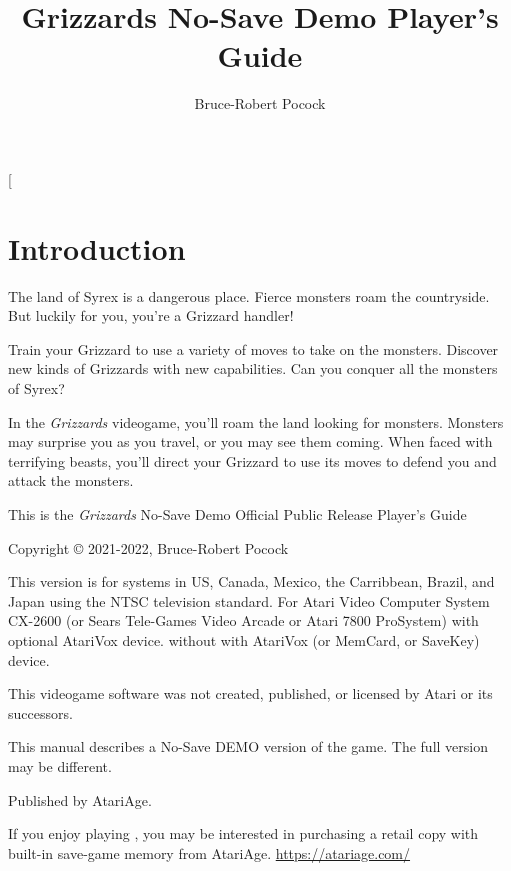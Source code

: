 \documentclass[10pt,twocolumn,openany,article]{memoir}
\title{Grizzards \ifdefined\NOSAVE No-Save \fi\ifdefined\DEMO Demo \fi Player's Guide}
\author{Bruce-Robert Pocock}
\newcommand\TV{NTSC}
\newcommand\REGION{US, Canada, Mexico, the Carribbean, Brazil, and Japan}
\newcommand\TV{PAL}
\newcommand\REGION{UK and Europe (except France)}
\newcommand\TV{SECAM}
\newcommand\REGION{France, Russia, and Africa}
\begin{document}
\frontmatter


\thispagestyle{empty}


\twocolumn[

\chapter*{Introduction}\label{Introduction}

The  land of  Syrex  is  a dangerous  place.  Fierce  monsters roam  the
countryside. But luckily for you, you're a Grizzard handler!

Train your Grizzard to  use a variety of moves to  take on the monsters.
Discover new kinds  of Grizzards with new capabilities.  Can you conquer
all the monsters of Syrex?

\bigskip

In the  \textit{Grizzards} videogame, you'll  roam the land  looking for
monsters. Monsters may  surprise you as you travel, or  you may see them
coming. When faced  with terrifying beasts, you'll  direct your Grizzard
to use its moves to defend you and attack the monsters.

\vspace{1in}\vfill

This    is    the     \textit{Grizzards}    \ifdefined\NOSAVE    No-Save
\fi\ifdefined\DEMO Demo \fi\ifdefined\ATARIAGESAVE Official \else Public
Release \fi Player's Guide

Copyright \copyright{} 2021-2022, Bruce-Robert Pocock

\bigskip

This  version is  for systems  in \REGION{}  using the  \TV{} television
standard. For Atari  Video Computer System CX-2600  (or Sears Tele-Games
Video  Arcade  or  Atari 7800  ProSystem)  \ifdefined\ATARIAGESAVE  with
optional AtariVox device. \else \ifdefined\NOSAVE without \else with \fi
AtariVox (or MemCard, or SaveKey) device. \fi

\bigskip

This videogame software was not created, published, or licensed by Atari
or its successors.

\ifdefined\DEMO
\bigskip

This manual  describes a \ifdefined\NOSAVE  No-Save \fi DEMO  version of
the game. The full version may be different.

\fi

Published by AtariAge.

\ifdefined\ATARIAGESAVE\else  If you  enjoy playing  ,
you  may  be  interested  in  purchasing a  retail  copy  with  built-in
save-game          memory           from          AtariAge.          \fi
\href{https://atariage.com/}{https://atariage.com/}
\end{document}
